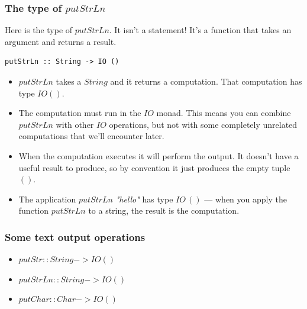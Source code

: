 \documentclass{beamer}
\begin{document}
\begin{frame}[fragile]
\frametitle{The type of $putStrLn$}

Here is the type of $putStrLn$.  It isn't a statement!  It's a
function that takes an argument and returns a result.

\begin{verbatim}
putStrLn :: String -> IO ()
\end{verbatim}

\begin{itemize}
\item $putStrLn$ takes a $String$ and it returns a computation.
  That computation has type $IO ()$.
\item The computation must run in the $IO$ monad.  This means you
  can combine $putStrLn$ with other $IO$ operations, but not with
  some completely unrelated computations that we'll encounter
  later.
\item When the computation executes it will perform the output.  It
  doesn't have a useful result to produce, so by convention it just
  produces the empty tuple $()$.
\item The application $putStrLn$\emph{ "hello"} has type $IO\, ()$ --- when
  you apply the function $putStrLn$ to a string, the result is the
  computation.
\end{itemize}

\end{frame}

\begin{frame}[fragile]
\frametitle{Some text output operations}

\begin{itemize}
\item $putStr :: String -> IO ()$
\item $putStrLn :: String -> IO ()$
\item $putChar :: Char -> IO ()$
\end{itemize}

\end{frame}
\end{document}
